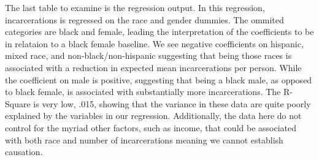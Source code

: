 \documentclass{article}
\begin{document}


The last table to examine is the regression output. In this regression, incarcerations is regressed on the race and gender dummies. The ommited categories are black and female, leading the interpretation of the coefficients to be in relataion to a black female baseline. We see negative coefficients on hispanic, mixed race, and non-black/non-hispanic suggesting that being those races is associated with a reduction in expected mean incarcerations per person. While the coefficient on male is positive, suggesting that being a black male, as opposed to black female, is associated with substantially more incarcerations. The R-Square is very low, .015, showing that the variance in these data are quite poorly explained by the variables in our regression. Additionally, the data here do not control for the myriad other factors, such as income, that could be associated with both race and number of incarcerations meaning we cannot establish causation.


\end{document}
